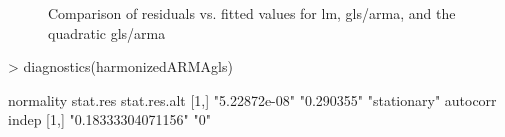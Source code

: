 \documentclass[11pt, a4paper]{article} %
\begin{document}
\begin{figure}[ht]
\begin{center}
\qquad
{}
\qquad
{}
\end{center}
\caption{Comparison of residuals vs. fitted values for lm, gls/arma, and the quadratic gls/arma}
\label{comparison_finalgls}
\end{figure}

\begin{Schunk}
\begin{Sinput}
> diagnostics(harmonizedARMAgls)
\end{Sinput}
\begin{Soutput}
     normality     stat.res   stat.res.alt
[1,] "5.22872e-08" "0.290355" "stationary"
     autocorr           indep
[1,] "0.18333304071156" "0"  
\end{Soutput}
\end{Schunk}
\end{document}
